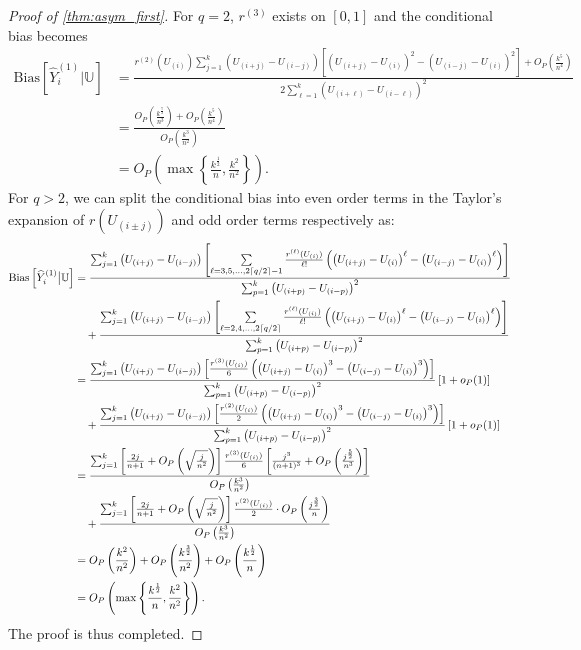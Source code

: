 \documentclass{uwstat572}
\theoremstyle{definition}
\DeclarePairedDelimiter\ceil{\lceil}{\rceil}
\renewcommand{\hat}{\widehat}
\theoremstyle{theorem}
\begin{document}
\begin{proof}[Proof of \autoref{thm:asym_first}]
For $q=2$, $r^{(3)}$ exists on $[0,1]$ and the conditional bias becomes
\begin{align*}
\mathrm{Bias}\left[\hat{Y}_i^{(1)} \big| \mathbb{U}\right] &= \frac{r^{(2)}(U_{(i)}) \sum_{j=1}^k \left(U_{(i+j)} -U_{(i-j)} \right)\left[\left(U_{(i+j)} -U_{(i)}\right)^2 - \left(U_{(i-j)} -U_{(i)}\right)^2\right] + O_P\left(\frac{k^5}{n^4}\right)}{2\sum_{\ell=1}^k \left(U_{(i+\ell)} - U_{(i-\ell)}\right)^2} \\
&=\frac{O_P\left(\frac{k^{\frac{7}{2}}}{n^3}\right) + O_P\left(\frac{k^5}{n^4}\right)}{O_P\left(\frac{k^3}{n^2}\right)}\\
&= O_P\left(\max\left\{\frac{k^{\frac{1}{2}}}{n},\frac{k^2}{n^2}\right\}\right).
\end{align*}
For $q>2$, we can split the conditional bias into even order terms in the Taylor's expansion of $r(U_{(i\pm j)})$ and odd order terms respectively as:
\begin{align*}
\mathrm{Bias}\left[\hat{Y}_i^{(1)} \big| \mathbb{U}\right] &= \frac{\sum_{j=1}^k \left(U_{(i+j)} - U_{(i-j)} \right)\left[\sum\limits_{\ell=3,5,...,2\ceil{q/2}-1} \frac{r^{(\ell)}(U_{(i)})}{\ell!} \left(\left(U_{(i+j)} - U_{(i)} \right)^{\ell} - \left(U_{(i-j)} - U_{(i)} \right)^{\ell} \right) \right]}{\sum_{p=1}^k \left(U_{(i+p)} - U_{(i-p)} \right)^2}\\
&\quad + \frac{\sum_{j=1}^k \left(U_{(i+j)} - U_{(i-j)} \right)\left[\sum\limits_{\ell=2,4,...,2\ceil{q/2}} \frac{r^{(\ell)}(U_{(i)})}{\ell!} \left(\left(U_{(i+j)} - U_{(i)} \right)^{\ell} - \left(U_{(i-j)} - U_{(i)} \right)^{\ell} \right) \right]}{\sum_{p=1}^k \left(U_{(i+p)} - U_{(i-p)} \right)^2} \\
&= \frac{\sum_{j=1}^k \left(U_{(i+j)} - U_{(i-j)} \right)\left[ \frac{r^{(3)}(U_{(i)})}{6} \left(\left(U_{(i+j)} - U_{(i)} \right)^3 - \left(U_{(i-j)} - U_{(i)} \right)^3 \right) \right]}{\sum_{p=1}^k \left(U_{(i+p)} - U_{(i-p)} \right)^2} \left[1+o_P(1)\right]\\
&\quad + \frac{\sum_{j=1}^k \left(U_{(i+j)} - U_{(i-j)} \right)\left[ \frac{r^{(2)}(U_{(i)})}{2} \left(\left(U_{(i+j)} - U_{(i)} \right)^3 - \left(U_{(i-j)} - U_{(i)} \right)^3 \right) \right]}{\sum_{p=1}^k \left(U_{(i+p)} - U_{(i-p)} \right)^2} \left[1+o_P(1)\right]\\
&= \frac{\sum_{j=1}^k \left[\frac{2j}{n+1} + O_P\left(\sqrt{\frac{j}{n^2}}\right)\right] \frac{r^{(3)}(U_{(i)})}{6} \left[\frac{j^3}{(n+1)^3} + O_P\left(\frac{j^{\frac{5}{2}}}{n^3}\right)\right]}{O_P\left(\frac{k^3}{n^2}\right)}\\
&\quad + \frac{\sum_{j=1}^k \left[\frac{2j}{n+1} + O_P\left(\sqrt{\frac{j}{n^2}}\right)\right] \frac{r^{(2)}(U_{(i)})}{2} \cdot O_P\left(\frac{j^{\frac{3}{2}}}{n}\right)}{O_P\left(\frac{k^3}{n^2}\right)}\\
&= O_P\left(\frac{k^2}{n^2}\right) + O_P\left(\frac{k^{\frac{3}{2}}}{n^2}\right) + O_P\left(\frac{k^{\frac{1}{2}}}{n}\right)\\
&= O_P\left(\max\left\{\frac{k^{\frac{1}{2}}}{n},\frac{k^2}{n^2}\right\}\right).
\end{align*}
The proof is thus completed.
\end{proof}
\end{document}
